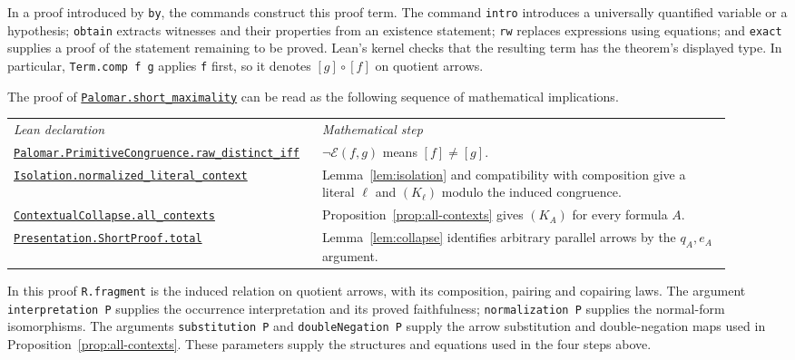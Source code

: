 \documentclass[11pt]{article}
\begin{document}
In a proof introduced by \texttt{by}, the commands construct this
proof term. The command \texttt{intro} introduces a universally
quantified variable or a hypothesis; \texttt{obtain} extracts
witnesses and their properties from an existence statement;
\texttt{rw} replaces expressions using equations; and
\texttt{exact} supplies a proof of the statement remaining to
be proved. Lean's kernel checks that the resulting term has the theorem's displayed type.
In particular, \texttt{Term.comp f g} applies \texttt{f} first,
so it denotes $[g]\circ[f]$ on quotient arrows.

The proof of \href{https://github.com/flengyel/Dosen-Petric-Maximality/blob/5dbee39bea09539bd130f729e82636419f71f920/DosenPetric/PalomarMaximality.lean\#L27}{\texttt{Palomar.short\_maximality}} can be read as
the following sequence of mathematical implications.
\begin{center}
\small
\begin{tabular}{>{\raggedright\arraybackslash}p{0.37\linewidth}>{\raggedright\arraybackslash}p{0.55\linewidth}}
\textit{Lean declaration} & \textit{Mathematical step}\\[3pt]
\href{https://github.com/flengyel/Dosen-Petric-Maximality/blob/5dbee39bea09539bd130f729e82636419f71f920/DosenPetric/PalomarCorrespondence.lean\#L121}{\texttt{Palomar.PrimitiveCongruence.\allowbreak{}raw\_distinct\_iff}}
 & $\neg\mathcal E(f,g)$ means $[f]\ne[g]$.\\[5pt]
\href{https://github.com/flengyel/Dosen-Petric-Maximality/blob/5dbee39bea09539bd130f729e82636419f71f920/DosenPetric/Isolation.lean\#L219}{\texttt{Isolation.\allowbreak{}normalized\_literal\_context}}
 & Lemma~\ref{lem:isolation} and compatibility with composition give a literal $\ell$ and $(K_\ell)$
   modulo the induced congruence.\\[5pt]
\href{https://github.com/flengyel/Dosen-Petric-Maximality/blob/5dbee39bea09539bd130f729e82636419f71f920/DosenPetric/Substitution.lean\#L90}{\texttt{ContextualCollapse.\allowbreak{}all\_contexts}}
 & Proposition~\ref{prop:all-contexts} gives $(K_A)$ for every formula $A$.\\[5pt]
\href{https://github.com/flengyel/Dosen-Petric-Maximality/blob/5dbee39bea09539bd130f729e82636419f71f920/DosenPetric/PresentationShortProjection.lean\#L86}{\texttt{Presentation.ShortProof.\allowbreak{}total}}
 & Lemma~\ref{lem:collapse} identifies arbitrary parallel arrows by
   the $q_A,e_A$ argument.
\end{tabular}
\end{center}
In this proof \texttt{R.fragment} is the induced relation on
quotient arrows, with its composition, pairing and copairing
laws. The argument \texttt{interpretation P} supplies the
occurrence interpretation and its proved faithfulness;
\texttt{normalization P} supplies the normal-form isomorphisms.
The arguments \texttt{substitution P} and
\texttt{doubleNegation P} supply the arrow substitution and
double-negation maps used in Proposition~\ref{prop:all-contexts}.
These parameters supply the structures and equations used in
the four steps above.
\end{document}
